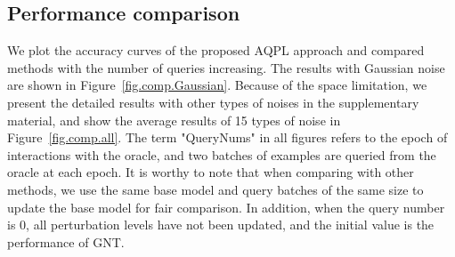 \documentclass[letterpaper]{article} %
\begin{document}



\subsection{Performance comparison}
We plot the accuracy curves of the proposed AQPL approach and compared methods with the number of queries increasing. The results with Gaussian noise are shown in Figure~\ref{fig.comp.Gaussian}. Because of the space limitation, we present the detailed results with other types of noises in the supplementary material, and show the average results of 15 types of noise in Figure~\ref{fig.comp.all}. The term "QueryNums" in all figures refers to the epoch of interactions with the oracle, and two batches of examples are queried from the oracle at each epoch. It is worthy to note that when comparing with other methods, we use the same base model and query batches of the same size to update the base model for fair comparison. In addition, when the query number is $0$, all perturbation levels have not been updated, and the initial value is the performance of GNT.
\end{document}
